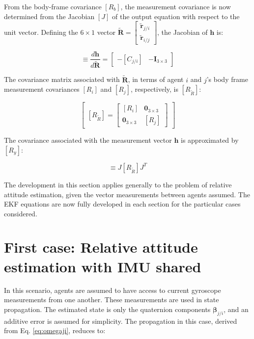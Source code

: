 \documentclass{aiaa-tc}
\newcommand{\B}[1]{\textbf{#1}} %
\newcommand{\BG}[1]{{\bm #1}}           %
\newcommand{\ddarg}[2]{\frac{d#1}{d#2}} %
\begin{document}
From the body-frame covariance $[R_b]$, the measurement covariance is now determined from the Jacobian $[J]$ of the output equation with respect to the unit vector. Defining the $6 \times 1$ vector $\tilde{\B{R}} = \begin{bmatrix}
\tilde{\B{r}}_{j/i} \\
\tilde{\B{r}}_{i/j}
\end{bmatrix}$, the Jacobian of $\B{h}$ is:

\begin{equation}
[J] \equiv \ddarg{\B{h}}{\tilde{\B{R}}} = \begin{bmatrix}
-[C_{j/i}] & -\B{I}_{3\times 3}
\end{bmatrix}
\end{equation}

The covariance matrix associated with $\tilde{\B{R}}$, in terms of agent $i$ and $j$'s body frame measurement covariances $[R_i]$ and $[R_j]$, respectively, is $[R_{\tilde{R}}]$:

\begin{equation}
\begin{bmatrix}
[R_{\tilde{R}}] = \begin{bmatrix}
[R_i] & \B{0}_{3\times 3} \\
\B{0}_{3\times 3} & [R_j]
\end{bmatrix}
\end{bmatrix}
\end{equation}

The covariance associated with the measurement vector $\B{h}$ is approximated by $[R_y]$:

\begin{equation}
[R_y] \equiv J[R_{\tilde{R}}]J^T
\end{equation}

The development in this section applies generally to the problem of relative attitude estimation, given the vector measurements between agents assumed. The EKF equations are now fully developed in each section for the particular cases considered.

\section{ First case: Relative attitude estimation with IMU shared }

In this scenario, agents are assumed to have access to current gyroscope measurements from one another. These measurements are used in state propagation. The estimated state is only the quaternion components $\BG{\beta}_{j/i}$, and an additive error is assumed for simplicity. The propagation in this case, derived from Eq. \ref{eq:omegaji}, reduces to:
\end{document}
